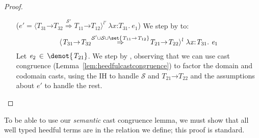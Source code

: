 \documentclass[9pt]{extarticle}
\newcommand{\ottnt}[1]{\mathit{#1}}
\newcommand{\ottsym}[1]{#1}
\begin{document}
{\begin{lemma}
\begin{proof}
{\begin{itemize}
\begin{itemize}
        show that $ \langle   \ottnt{T_{{\mathrm{11}}}} \mathord{ \rightarrow } \ottnt{T_{{\mathrm{12}}}}   \mathord{ \overset{ \mathcal{S} }{\Rightarrow} }   \ottnt{T_{{\mathrm{21}}}} \mathord{ \rightarrow } \ottnt{T_{{\mathrm{22}}}}   \rangle^{ \ottnt{l} } ~   \lambda \mathit{x} \mathord{:} \ottnt{T_{{\mathrm{11}}}} .~  \ottnt{e_{{\mathrm{1}}}}   \, \in \,  \denot{  \ottnt{T_{{\mathrm{21}}}} \mathord{ \rightarrow } \ottnt{T_{{\mathrm{22}}}}  } $. Let $\ottnt{e_{{\mathrm{2}}}} \, \in \,  \denot{ \ottnt{T_{{\mathrm{21}}}} } $ be a heedful \lambdah result.
We can step by  and then apply the IH on the smaller
        domain and codomain types.
      \item[($\ottnt{e'}  \ottsym{=}   \langle   \ottnt{T_{{\mathrm{31}}}} \mathord{ \rightarrow } \ottnt{T_{{\mathrm{32}}}}   \mathord{ \overset{ \mathcal{S}' }{\Rightarrow} }   \ottnt{T_{{\mathrm{11}}}} \mathord{ \rightarrow } \ottnt{T_{{\mathrm{12}}}}   \rangle^{ \ottnt{l'} } ~   \lambda \mathit{x} \mathord{:} \ottnt{T_{{\mathrm{31}}}} .~  \ottnt{e_{{\mathrm{1}}}}  $)] We
        step by  to:
\[  \langle   \ottnt{T_{{\mathrm{31}}}} \mathord{ \rightarrow } \ottnt{T_{{\mathrm{32}}}}   \mathord{ \overset{   \mathcal{S}'  \cup  \mathcal{S}   \cup   \set{   \ottnt{T_{{\mathrm{11}}}} \mathord{ \rightarrow } \ottnt{T_{{\mathrm{12}}}}   }   }{\Rightarrow} }   \ottnt{T_{{\mathrm{21}}}} \mathord{ \rightarrow } \ottnt{T_{{\mathrm{22}}}}   \rangle^{ \ottnt{l} } ~   \lambda \mathit{x} \mathord{:} \ottnt{T_{{\mathrm{31}}}} .~  \ottnt{e_{{\mathrm{1}}}}   \]
Let $\ottnt{e_{{\mathrm{2}}}} \, \in \,  \denot{ \ottnt{T_{{\mathrm{21}}}} } $. We step by , observing that
        we can use cast congruence
        (Lemma~\ref{lem:heedfulcastcongruence}) to factor the domain
        and codomain casts, using the IH to handle $\mathcal{S}$ and
        $ \ottnt{T_{{\mathrm{21}}}} \mathord{ \rightarrow } \ottnt{T_{{\mathrm{22}}}} $ and the assumptions about $\ottnt{e'}$ to handle
        the rest.
      \end{itemize}      
    \end{itemize}
    \fi}
  \end{proof}
\end{lemma}

To be able to use our \textit{semantic} cast congruence lemma, we must
show that all well typed heedful \lambdah terms are in the relation we
define; this proof is standard.

\begin{lemma}
  \label{lem:heedfulnormalizes}
  ~


\end{lemma}}
\end{document}
